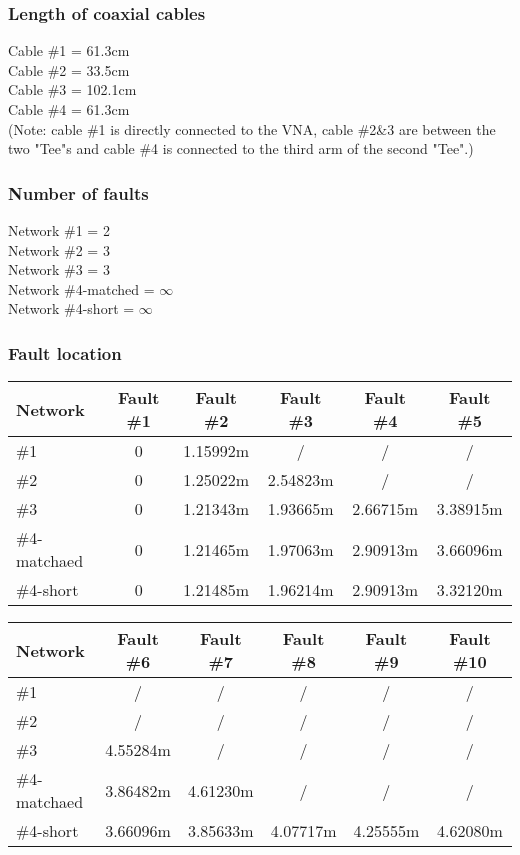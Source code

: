 \documentclass[11pt,oneside,a4paper]{report}
\begin{document}
\subsubsection{Length of coaxial cables}
Cable \#1 = 61.3cm\\
Cable \#2 = 33.5cm\\
Cable \#3 = 102.1cm\\
Cable \#4 = 61.3cm\\
(Note: cable \#1 is directly connected to the VNA, cable \#2\&3 are between the two "Tee"s and cable \#4 is connected to the third arm of the second "Tee".)

\subsubsection*{Number of faults}
Network \#1 = 2\\
Network \#2 = 3\\
Network \#3 = 3\\
Network \#4-matched = \(\infty\)\\
Network \#4-short = \(\infty\)
\subsubsection*{Fault location}
\begin{table}[htbp]
\begin{tabular}{lccccc}
\toprule
Network & Fault \#1 & Fault \#2 & Fault \#3 & Fault \#4 & Fault \#5 \\
\midrule
\#1 & 0 & 1.15992m & / & / & / \\
\#2 & 0 & 1.25022m & 2.54823m & / & / \\
\#3 & 0 & 1.21343m & 1.93665m & 2.66715m & 3.38915m \\
\#4-matchaed & 0 & 1.21465m & 1.97063m & 2.90913m & 3.66096m \\
\#4-short & 0 & 1.21485m & 1.96214m & 2.90913m & 3.32120m \\
\bottomrule
\end{tabular}
\end{table}

\begin{table}[htbp]
\begin{tabular}{lccccc}
\toprule
Network & Fault \#6 & Fault \#7 & Fault \#8 & Fault \#9 & Fault \#10 \\
\midrule
\#1 & / & / & / & / & / \\
\#2 & / & / & / & / & / \\
\#3 & 4.55284m & / & / & / & / \\
\#4-matchaed & 3.86482m & 4.61230m & / & / & / \\
\#4-short & 3.66096m & 3.85633m & 4.07717m & 4.25555m & 4.62080m \\
\bottomrule
\end{tabular}
\end{table}
\end{document}
